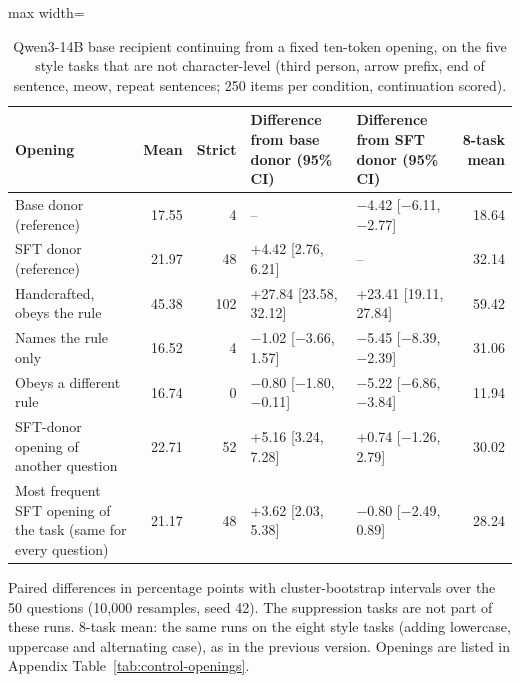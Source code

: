 \begin{table}[t]
\centering\small
\caption{Qwen3-14B base recipient continuing from a fixed ten-token opening, on the five style tasks that are not character-level (third person, arrow prefix, end of sentence, meow, repeat sentences; 250 items per condition, continuation scored).}\label{tab:controls}
\setlength{\tabcolsep}{4pt}
\begin{adjustbox}{max width=\linewidth}
\begin{tabular}{lrrllr}
\toprule
Opening & Mean & Strict & Difference from base donor (95\% CI) & Difference from SFT donor (95\% CI) & 8-task mean \\
\midrule
Base donor (reference) & 17.55 & 4 & -- & $-$4.42 [$-$6.11, $-$2.77] & 18.64 \\
SFT donor (reference) & 21.97 & 48 & +4.42 [2.76, 6.21] & -- & 32.14 \\
Handcrafted, obeys the rule & 45.38 & 102 & +27.84 [23.58, 32.12] & +23.41 [19.11, 27.84] & 59.42 \\
Names the rule only & 16.52 & 4 & $-$1.02 [$-$3.66, 1.57] & $-$5.45 [$-$8.39, $-$2.39] & 31.06 \\
Obeys a different rule & 16.74 & 0 & $-$0.80 [$-$1.80, $-$0.11] & $-$5.22 [$-$6.86, $-$3.84] & 11.94 \\
SFT-donor opening of another question & 22.71 & 52 & +5.16 [3.24, 7.28] & +0.74 [$-$1.26, 2.79] & 30.02 \\
Most frequent SFT opening of the task (same for every question) & 21.17 & 48 & +3.62 [2.03, 5.38] & $-$0.80 [$-$2.49, 0.89] & 28.24 \\
\bottomrule
\end{tabular}
\end{adjustbox}
\par\smallskip\begin{minipage}{0.97\linewidth}\footnotesize Paired differences in percentage points with cluster-bootstrap intervals over the 50 questions (10{,}000 resamples, seed 42). The suppression tasks are not part of these runs. 8-task mean: the same runs on the eight style tasks (adding lowercase, uppercase and alternating case), as in the previous version. Openings are listed in Appendix Table~\ref{tab:control-openings}.\end{minipage}
\end{table}
